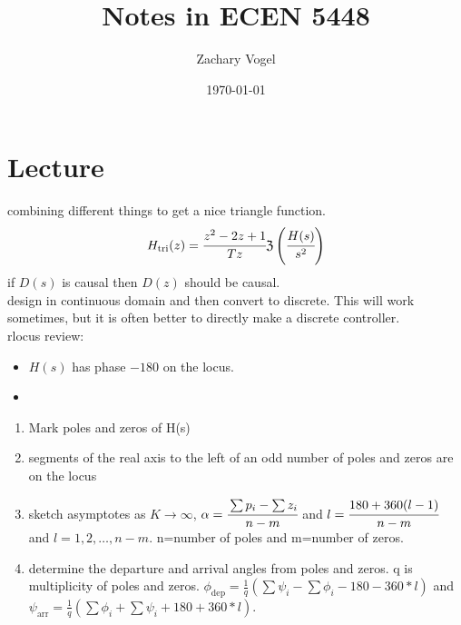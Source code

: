 \documentclass{article}
\author{Zachary Vogel}
\date{\today}
\title{Notes in ECEN 5448}
\begin{document}
\maketitle


\section*{Lecture}
combining different things to get a nice triangle function.
\[H_{\text{tri}}(z)=\cfrac{z^2-2z+1}{Tz}\mathfrak{Z}\left (\cfrac{H(s)}{s^2}\right )\]
if $D(s)$ is causal then $D(z)$ should be causal.\\

design in continuous domain and then convert to discrete. This will work sometimes, but it is often better to directly make a discrete controller.\\

rlocus review:
\begin{itemize}
    \item $H(s)$ has phase $-180$ on the locus.
    \item
\end{itemize}
\begin{enumerate}
    \item Mark poles and zeros of H(s)
    \item segments of the real axis to the left of an odd number of poles and zeros are on the locus
    \item sketch asymptotes as $K\to\infty$, $\alpha=\cfrac{\sum p_i-\sum z_i}{n-m}$ and $l=\cfrac{180+360(l-1)}{n-m}$ and $l=1,2,\dots,n-m$. n=number of poles and m=number of zeros.
    \item determine the departure and arrival angles from poles and zeros. q is multiplicity of poles and zeros. $\phi_{\text{dep}}=\frac{1}{q}(\sum\psi_i-\sum\phi_i-180-360*l)$ and $\psi_{\text{arr}}=\frac{1}{q}(\sum \phi_i+\sum\psi_i+180+360*l)$.
\end{enumerate}
\end{document}
